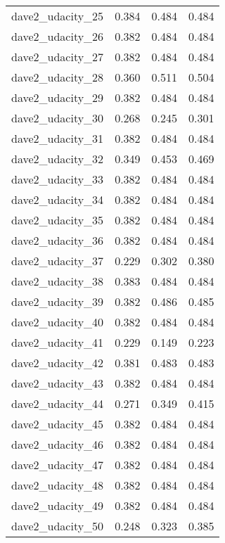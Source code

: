 \begin{tabular}{lrrr}
dave2\_udacity\_25  &          0.384 &   0.484 &   0.484 \\
dave2\_udacity\_26  &          0.382 &   0.484 &   0.484 \\
dave2\_udacity\_27  &          0.382 &   0.484 &   0.484 \\
dave2\_udacity\_28  &          0.360 &   0.511 &   0.504 \\
dave2\_udacity\_29  &          0.382 &   0.484 &   0.484 \\
dave2\_udacity\_30  &          0.268 &   0.245 &   0.301 \\
dave2\_udacity\_31  &          0.382 &   0.484 &   0.484 \\
dave2\_udacity\_32  &          0.349 &   0.453 &   0.469 \\
dave2\_udacity\_33  &          0.382 &   0.484 &   0.484 \\
dave2\_udacity\_34  &          0.382 &   0.484 &   0.484 \\
dave2\_udacity\_35  &          0.382 &   0.484 &   0.484 \\
dave2\_udacity\_36  &          0.382 &   0.484 &   0.484 \\
dave2\_udacity\_37  &          0.229 &   0.302 &   0.380 \\
dave2\_udacity\_38  &          0.383 &   0.484 &   0.484 \\
dave2\_udacity\_39  &          0.382 &   0.486 &   0.485 \\
dave2\_udacity\_40  &          0.382 &   0.484 &   0.484 \\
dave2\_udacity\_41  &          0.229 &   0.149 &   0.223 \\
dave2\_udacity\_42  &          0.381 &   0.483 &   0.483 \\
dave2\_udacity\_43  &          0.382 &   0.484 &   0.484 \\
dave2\_udacity\_44  &          0.271 &   0.349 &   0.415 \\
dave2\_udacity\_45  &          0.382 &   0.484 &   0.484 \\
dave2\_udacity\_46  &          0.382 &   0.484 &   0.484 \\
dave2\_udacity\_47  &          0.382 &   0.484 &   0.484 \\
dave2\_udacity\_48  &          0.382 &   0.484 &   0.484 \\
dave2\_udacity\_49  &          0.382 &   0.484 &   0.484 \\
dave2\_udacity\_50  &          0.248 &   0.323 &   0.385 \\

\end{tabular}
